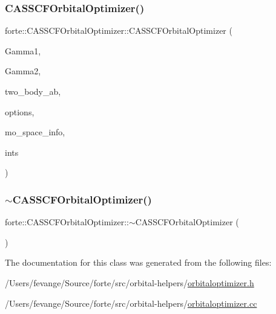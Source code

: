 \subsubsection{\texorpdfstring{C\+A\+S\+S\+C\+F\+Orbital\+Optimizer()}{CASSCFOrbitalOptimizer()}}
{\footnotesize\ttfamily forte\+::\+C\+A\+S\+S\+C\+F\+Orbital\+Optimizer\+::\+C\+A\+S\+S\+C\+F\+Orbital\+Optimizer (\begin{DoxyParamCaption}\item[{ambit\+::\+Tensor}]{Gamma1,  }\item[{ambit\+::\+Tensor}]{Gamma2,  }\item[{ambit\+::\+Tensor}]{two\+\_\+body\+\_\+ab,  }\item[{std\+::shared\+\_\+ptr$<$ \mbox{\hyperlink{classforte_1_1_forte_options}{Forte\+Options}} $>$}]{options,  }\item[{std\+::shared\+\_\+ptr$<$ \mbox{\hyperlink{classforte_1_1_m_o_space_info}{M\+O\+Space\+Info}} $>$}]{mo\+\_\+space\+\_\+info,  }\item[{std\+::shared\+\_\+ptr$<$ \mbox{\hyperlink{classforte_1_1_forte_integrals}{Forte\+Integrals}} $>$}]{ints }\end{DoxyParamCaption})}

\mbox{\label{classforte_1_1_c_a_s_s_c_f_orbital_optimizer_a54dd9f2b7d0549031d051a89d3a0d561}} 
\subsubsection{\texorpdfstring{$\sim$\+C\+A\+S\+S\+C\+F\+Orbital\+Optimizer()}{~CASSCFOrbitalOptimizer()}}
{\footnotesize\ttfamily forte\+::\+C\+A\+S\+S\+C\+F\+Orbital\+Optimizer\+::$\sim$\+C\+A\+S\+S\+C\+F\+Orbital\+Optimizer (\begin{DoxyParamCaption}{ }\end{DoxyParamCaption})\hspace{0.3cm}{\ttfamily [virtual]}}



The documentation for this class was generated from the following files\+:\begin{DoxyCompactItemize}
\item 
/\+Users/fevange/\+Source/forte/src/orbital-\/helpers/\mbox{\hyperlink{orbitaloptimizer_8h}{orbitaloptimizer.\+h}}\item 
/\+Users/fevange/\+Source/forte/src/orbital-\/helpers/\mbox{\hyperlink{orbitaloptimizer_8cc}{orbitaloptimizer.\+cc}}\end{DoxyCompactItemize}
